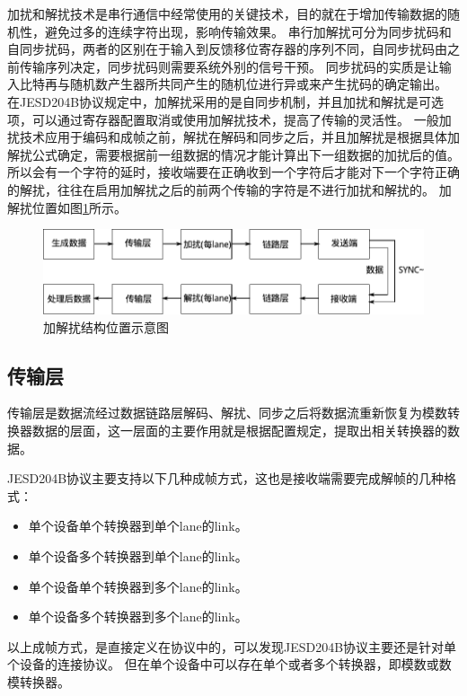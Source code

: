 \documentclass[UTF8]{ctexart}
\begin{document}
加扰和解扰技术是串行通信中经常使用的关键技术，目的就在于增加传输数据的随机性，避免过多的连续字符出现，影响传输效果。
串行加解扰可分为同步扰码和自同步扰码，两者的区别在于输入到反馈移位寄存器的序列不同，自同步扰码由之前传输序列决定，同步扰码则需要系统外别的信号干预。
同步扰码的实质是让输入比特再与随机数产生器所共同产生的随机位进行异或来产生扰码的确定输出。
在JESD204B协议规定中，加解扰采用的是自同步机制，并且加扰和解扰是可选项，可以通过寄存器配置取消或使用加解扰技术，提高了传输的灵活性。
一般加扰技术应用于编码和成帧之前，解扰在解码和同步之后，并且加解扰是根据具体加解扰公式确定，需要根据前一组数据的情况才能计算出下一组数据的加扰后的值。
所以会有一个字符的延时，接收端要在正确收到一个字符后才能对下一个字符正确的解扰，往往在启用加解扰之后的前两个传输的字符是不进行加扰和解扰的。
加解扰位置如图\ref{fig:functional_location_of_scrambler_and_descrambler}所示。

\begin{figure}[H]
\centering
\includegraphics[width=15cm]{./img/functional_location_of_scrambler_and_descrambler.pdf}
\caption{加解扰结构位置示意图}
\label{fig:functional_location_of_scrambler_and_descrambler}
\end{figure}

\subsection{传输层}

传输层是数据流经过数据链路层解码、解扰、同步之后将数据流重新恢复为模数转换器数据的层面，这一层面的主要作用就是根据配置规定，提取出相关转换器的数据。

JESD204B协议主要支持以下几种成帧方式，这也是接收端需要完成解帧的几种格式：

\begin{itemize}
\item 单个设备单个转换器到单个lane的link。
\item 单个设备多个转换器到单个lane的link。
\item 单个设备单个转换器到多个lane的link。
\item 单个设备多个转换器到多个lane的link。
\end{itemize}

以上成帧方式，是直接定义在协议中的，可以发现JESD204B协议主要还是针对单个设备的连接协议。
但在单个设备中可以存在单个或者多个转换器，即模数或数模转换器。
\end{document}

